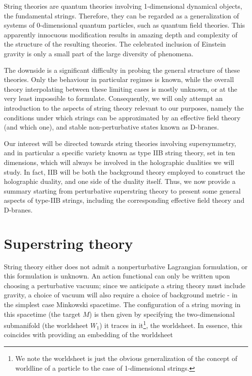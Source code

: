 String theories are quantum theories involving 1-dimensional dynamical objects, the fundamental strings. Therefore, they can be regarded as a generalization of systems of 0-dimensional quantum particles, such as quantum field theories. This apparently innocuous modification results in amazing depth and complexity of the structure of the resulting theories. The celebrated inclusion of Einstein gravity is only a small part of the large diversity of phenomena. 

The downside is a significant difficulty in probing the general structure of these theories. Only the behaviour in particular regimes is known, while the overall theory interpolating between these limiting cases is mostly unknown, or at the very least impossible to formulate. Consequently, we will only attempt an introduction to the aspects of string theory relevant to our purposes, namely the conditions under which strings can be approximated by an effective field theory (and which one), and stable non-perturbative states known as D-branes.

Our interest will be directed towards string theories involving supersymmetry, and in particular a specific variety known as type IIB string theory, set in ten dimensions, which will always be involved in the holographic dualities we will study. In fact, IIB will be both the background theory employed to construct the holographic duality, and one side of the duality itself. Thus, we now provide a summary starting from perturbative superstring theory to present some general aspects of type-IIB strings, including the corresponding effective field theory and D-branes.

\section{Superstring theory}

String theory either does not admit a nonperturbative Lagrangian formulation, or this formulation is unknown. An action functional can only be written upon choosing a perturbative vacuum; since we anticipate a string theory must include gravity, a choice of vacuum will also require a choice of background metric - in the simplest case Minkowski spacetime. The configuration of a string moving in this spacetime (the target $M$) is then given by specifying the two-dimensional submanifold (the worldsheet $W_1$) it traces in it\footnote{We note the worldsheet is just the obvious generalization of the concept of worldline of a particle to the case of 1-dimensional strings.}, the worldsheet. In essence, this coincides with providing an embedding of the worldsheet

